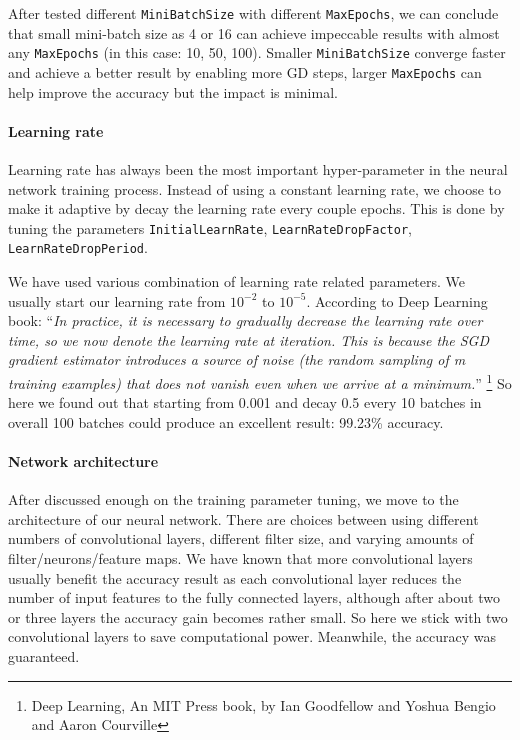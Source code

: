 \documentclass{article}
\begin{document}
After tested different \verb|MiniBatchSize| with different \verb|MaxEpochs|, we can conclude that small mini-batch size as 4 or 16 can achieve impeccable results with almost any \verb|MaxEpochs| (in this case: 10, 50, 100). Smaller  \verb|MiniBatchSize| converge faster and achieve a better result by enabling more GD steps, larger \verb|MaxEpochs| can help improve the accuracy but the impact is minimal.

\paragraph{Learning rate}

Learning rate has always been the most important hyper-parameter in the neural network training process. Instead of using a constant learning rate, we choose to make it adaptive by decay the learning rate every couple epochs. This is done by tuning the parameters \verb|InitialLearnRate|, \verb|LearnRateDropFactor|, \verb|LearnRateDropPeriod|.

We have used various combination of learning rate related parameters. We usually start our learning rate from $10^{-2}$ to $10^{-5}$. According to Deep Learning book: ``\textit{In practice, it is necessary to gradually decrease the learning rate over time, so we now denote the learning rate at iteration. This is because the SGD gradient estimator introduces a source of noise (the random sampling of m training examples) that does not vanish even when we arrive at a minimum.}'' \footnote{Deep Learning, An MIT Press book, by Ian Goodfellow and Yoshua Bengio and Aaron Courville} So here we found out that starting from 0.001 and decay 0.5 every 10 batches in overall 100 batches could produce an excellent result: 99.23\% accuracy.

\paragraph{Network architecture}

After discussed enough on the training parameter tuning, we move to the architecture of our neural network. There are choices between using different numbers of convolutional layers, different filter size, and varying amounts of filter/neurons/feature maps. We have known that more convolutional layers usually benefit the accuracy result as each convolutional layer reduces the number of input features to the fully connected layers, although after about two or three layers the accuracy gain becomes rather small. So here we stick with two convolutional layers to save computational power. Meanwhile, the accuracy was guaranteed. 
\end{document}
